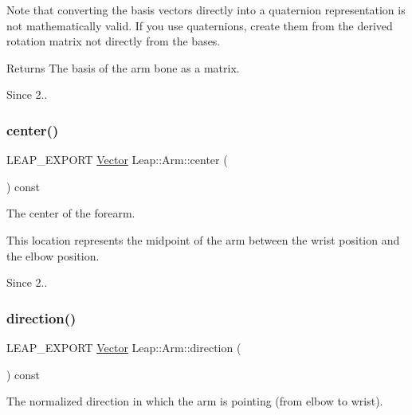 Note that converting the basis vectors directly into a quaternion representation is not mathematically valid. If you use quaternions, create them from the derived rotation matrix not directly from the bases.

\begin{DoxyReturn}{Returns}
The basis of the arm bone as a matrix. 
\end{DoxyReturn}
\begin{DoxySince}{Since}
2.. 
\end{DoxySince}
\mbox{\label{class_leap_1_1_arm_a3159add2e3c4d5c3bbb5118a0e01af11}} 
\subsubsection{\texorpdfstring{center()}{center()}}
{\footnotesize\ttfamily L\+E\+A\+P\+\_\+\+E\+X\+P\+O\+RT \hyperlink{struct_leap_1_1_vector}{Vector} Leap\+::\+Arm\+::center (\begin{DoxyParamCaption}{ }\end{DoxyParamCaption}) const}

The center of the forearm.

This location represents the midpoint of the arm between the wrist position and the elbow position.

\begin{DoxySince}{Since}
2.. 
\end{DoxySince}
\mbox{\label{class_leap_1_1_arm_a5c09d28debc4e43d557cff04f62b621d}} 
\subsubsection{\texorpdfstring{direction()}{direction()}}
{\footnotesize\ttfamily L\+E\+A\+P\+\_\+\+E\+X\+P\+O\+RT \hyperlink{struct_leap_1_1_vector}{Vector} Leap\+::\+Arm\+::direction (\begin{DoxyParamCaption}{ }\end{DoxyParamCaption}) const}

The normalized direction in which the arm is pointing (from elbow to wrist).


\begin{DoxyCodeInclude}
\end{DoxyCodeInclude}


